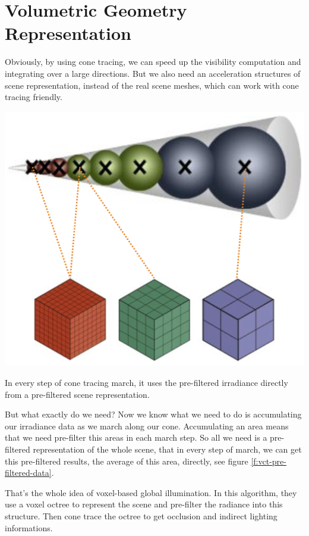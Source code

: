 \section{Volumetric Geometry Representation}
Obviously, by using cone tracing, we can speed up the visibility computation and integrating over a large directions. But we also need an acceleration structures of scene representation, instead of the real scene meshes, which can work with cone tracing friendly. 

\begin{marginfigure}
	\includegraphics{graphics/vct/vct-2-4}
	\caption{In every step of cone tracing march, it uses the pre-filtered irradiance directly from a pre-filtered scene representation.}
	\label{f:vct-pre-filtered-data}
\end{marginfigure}

But what exactly do we need? Now we know what we need to do is accumulating our irradiance data as we march along our cone. Accumulating an area means that we need pre-filter this areas in each march step. So all we need is a pre-filtered representation of the whole scene, that in every step of march, we can get this pre-filtered results, the average of this area, directly, see figure \ref{f:vct-pre-filtered-data}.


That's the whole idea of voxel-based global illumination. In this algorithm, they use a voxel octree to represent the scene and pre-filter the radiance into this structure. Then cone trace the octree to get occlusion and indirect lighting informations. 

